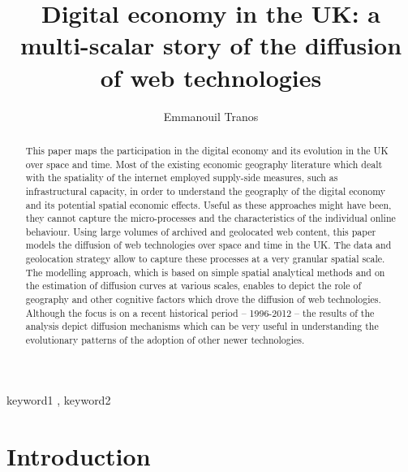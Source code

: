 \documentclass[
  authoryear,
  preprint,
  3p]{elsarticle}
\begin{document}
\begin{frontmatter}
\title{Digital economy in the UK: a multi-scalar story of the diffusion
of web technologies}
\author[1]{Emmanouil Tranos%
%
}



        
\begin{abstract}
This paper maps the participation in the digital economy and its
evolution in the UK over space and time. Most of the existing economic
geography literature which dealt with the spatiality of the internet
employed supply-side measures, such as infrastructural capacity, in
order to understand the geography of the digital economy and its
potential spatial economic effects. Useful as these approaches might
have been, they cannot capture the micro-processes and the
characteristics of the individual online behaviour. Using large volumes
of archived and geolocated web content, this paper models the diffusion
of web technologies over space and time in the UK. The data and
geolocation strategy allow to capture these processes at a very granular
spatial scale. The modelling approach, which is based on simple spatial
analytical methods and on the estimation of diffusion curves at various
scales, enables to depict the role of geography and other cognitive
factors which drove the diffusion of web technologies. Although the
focus is on a recent historical period -- 1996-2012 -- the results of
the analysis depict diffusion mechanisms which can be very useful in
understanding the evolutionary patterns of the adoption of other newer
technologies.
\end{abstract}





\begin{keyword}
    keyword1 \sep 
    keyword2
\end{keyword}
\end{frontmatter}
    \ifdefined\Shaded\renewenvironment{Shaded}{\begin{tcolorbox}[breakable, frame hidden, boxrule=0pt, interior hidden, borderline west={3pt}{0pt}{shadecolor}, enhanced, sharp corners]}{\end{tcolorbox}}\fi

\hypertarget{sec1}{%
\section{Introduction}\label{sec1}}
\end{document}
